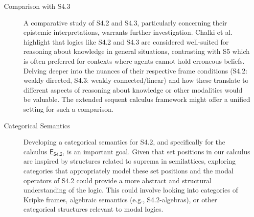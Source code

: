 \documentclass{article}
\theoremstyle{definition}
\begin{document}
{\begin{description}
    \item[Comparison with S4.3]
    A comparative study of S4.2 and S4.3, particularly concerning their epistemic interpretations, warrants further investigation. Chalki et al.~\cite{Chalki2018:S42Tour} highlight that logics like S4.2 and S4.3 are considered well-suited for reasoning about knowledge in general situations, contrasting with S5 which is often preferred for contexts where agents cannot hold erroneous beliefs. Delving deeper into the nuances of their respective frame conditions (S4.2: weakly directed, S4.3: weakly connected/linear) and how these translate to different aspects of reasoning about knowledge or other modalities would be valuable. The extended sequent calculus framework might offer a unified setting for such a comparison.

    \item[Categorical Semantics]
    Developing a categorical semantics for S4.2, and specifically for the calculus $\mathsf{E}_{{\textsf{S4.2}}}$, is an important goal. Given that set positions in our calculus are inspired by structures related to suprema in semilattices, exploring categories that appropriately model these set positions and the modal operators of S4.2 could provide a more abstract and structural understanding of the logic. This could involve looking into categories of Kripke frames, algebraic semantics (e.g., S4.2-algebras), or other categorical structures relevant to modal logics.
\end{description}
}
\end{document}
